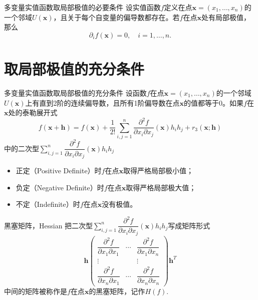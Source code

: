 \begin{frame}

\begin{block}{多变量实值函数取局部极值的必要条件}
设实值函数$f$定义在点$\mathbf{x} = (x_1,\ldots,x_n)$的一个邻域$U(\mathbf{x})$，且关于每个自变量的偏导数都存在。若$f$在点$\mathbf{x}$处有局部极值，那么
\[\partial_i f(\mathbf{x}) = 0, \quad i = 1,\ldots,n.\]
\end{block}

\end{frame}


\section{取局部极值的充分条件}


\begin{frame}

\begin{block}{多变量实值函数取局部极值的充分条件}
设函数$f$在点$\mathbf{x} = (x_1,\ldots,x_n)$的一个邻域$U(\mathbf{x})$上有直到2阶的连续偏导数，且所有1阶偏导数在点$\mathbf{x}$的值都等于0。如果$f$在$\mathbf{x}$处的泰勒展开式
\[f(\mathbf{x} + \mathbf{h}) = f(\mathbf{x}) + \dfrac{1}{2!} \sum\limits_{i,j=1}^n \dfrac{\partial^2 f}{\partial x_i \partial x_j}(\mathbf{x})h_ih_j + r_3(\mathbf{x}; \mathbf{h})\]
中的二次型\(\displaystyle \sum\limits_{i,j=1}^n \dfrac{\partial^2 f}{\partial x_i \partial x_j}(\mathbf{x})h_ih_j\)
\begin{itemize}
\item 正定（Positive Definite）时$f$在点$\mathbf{x}$取得严格局部极小值；
\item 负定（Negative Definite）时$f$在点$\mathbf{x}$取得严格局部极大值；
\item 不定（Indefinite）时$f$在点$\mathbf{x}$没有极值。
\end{itemize}
\end{block}

\end{frame}


\begin{frame}

\begin{block}{黑塞矩阵，Hessian}
把二次型\(\displaystyle \sum\limits_{i,j=1}^n \dfrac{\partial^2 f}{\partial x_i \partial x_j}(\mathbf{x})h_ih_j\)写成矩阵形式
\[\mathbf{h}\begin{pmatrix}
\dfrac{\partial^2 f}{\partial x_1 \partial x_1} & \cdots & \dfrac{\partial^2 f}{\partial x_1 \partial x_n} \\
\vdots & & \vdots \\
\dfrac{\partial^2 f}{\partial x_n \partial x_1} & \cdots & \dfrac{\partial^2 f}{\partial x_n \partial x_n}
\end{pmatrix}\mathbf{h}^T\]
中间的矩阵被称作是$f$在点$\mathbf{x}$的黑塞矩阵，记作$H(f).$
\end{block}

\end{frame}


